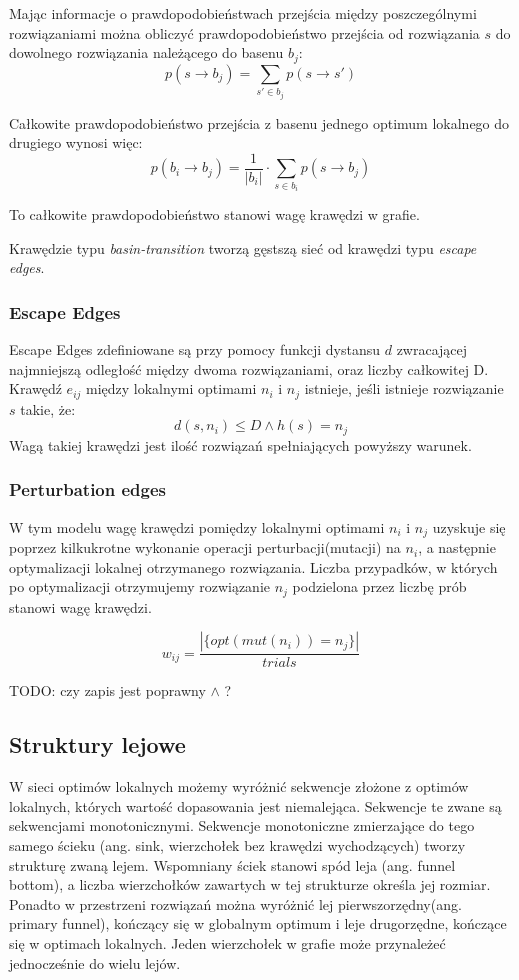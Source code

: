 Mając informacje o prawdopodobieństwach przejścia między poszczególnymi rozwiązaniami można obliczyć prawdopodobieństwo
przejścia od rozwiązania $s$ do dowolnego rozwiązania należącego do basenu $b_j$:
$$p(s \rightarrow b_j) = \sum_{s'\in{b_j}} p(s \rightarrow s')$$

Całkowite prawdopodobieństwo przejścia z basenu jednego optimum lokalnego do drugiego wynosi więc:
$$p(b_i \rightarrow b_j) = \frac{1}{|b_i|} \cdot \sum_{s\in{b_i}} p(s \rightarrow b_j)$$

To całkowite prawdopodobieństwo stanowi wagę krawędzi w grafie.

Krawędzie typu \textit{basin-transition} tworzą gęstszą sieć od krawędzi typu \textit{escape edges}.

\subsubsection*{Escape Edges}
Escape Edges zdefiniowane są przy pomocy funkcji dystansu $d$ zwracającej najmniejszą odległość między dwoma rozwiązaniami,
oraz liczby całkowitej D.
Krawędź $e_{ij}$ między lokalnymi optimami $n_i$ i $n_j$ istnieje, jeśli istnieje rozwiązanie $s$ takie, że:
\begin{equation}
      \label{eq:escape_edge_cond}
      d(s, n_i) \leq D \land h(s)=n_j
\end{equation}
Wagą takiej krawędzi jest ilość rozwiązań spełniających powyższy warunek.

\subsubsection{Perturbation edges}
W tym modelu wagę krawędzi pomiędzy lokalnymi optimami $n_i$ i $n_j$ uzyskuje się poprzez kilkukrotne wykonanie
operacji perturbacji(mutacji) na $n_i$, a następnie optymalizacji lokalnej otrzymanego rozwiązania.
Liczba przypadków, w których po optymalizacji otrzymujemy rozwiązanie $n_j$ podzielona przez liczbę prób stanowi wagę krawędzi.

$$
      w_{ij} = \frac{ |\{opt(mut(n_i)) = n_j\}| }{trials}
$$

TODO: czy zapis jest poprawny $\land$ ?

\subsection{Struktury lejowe}
W sieci optimów lokalnych możemy wyróżnić sekwencje złożone z optimów lokalnych, których wartość dopasowania jest niemalejąca.
Sekwencje te zwane są sekwencjami monotonicznymi\cite{DBLP:journals/heuristics/OchoaV18}.
Sekwencje monotoniczne zmierzające do tego samego ścieku (ang. sink, wierzchołek bez krawędzi wychodzących)
tworzy strukturę zwaną lejem. Wspomniany ściek stanowi spód leja (ang. funnel bottom), a liczba wierzchołków zawartych w tej strukturze określa jej rozmiar.
Ponadto w przestrzeni rozwiązań można wyróżnić lej pierwszorzędny(ang. primary funnel), kończący się w globalnym optimum i leje drugorzędne,
kończące się w optimach lokalnych. Jeden wierzchołek w grafie może przynależeć jednocześnie do wielu lejów.

